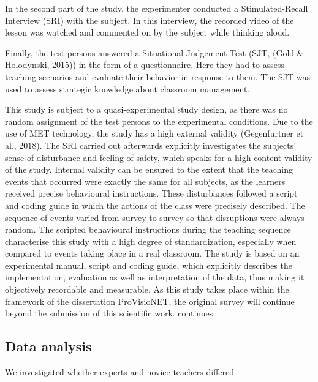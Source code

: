 \documentclass[
  man,floatsintext]{apa6}
\begin{document}
In the second part of the study, the experimenter conducted a Stimulated-Recall Interview (SRI) with the subject. In this interview, the recorded video of the lesson was watched and commented on by the subject while thinking aloud.

Finally, the test persons answered a Situational Judgement Test (SJT, (Gold \& Holodynski, 2015)) in the form of a questionnaire. Here they had to assess teaching scenarios and evaluate their behavior in response to them. The SJT was used to assess strategic knowledge about classroom management.

This study is subject to a quasi-experimental study design, as there was no random assignment of the test persons to the experimental conditions. Due to the use of MET technology, the study has a high external validity (Gegenfurtner et al., 2018). The SRI carried out afterwards explicitly investigates the subjects' sense of disturbance and feeling of safety, which speaks for a high content validity of the study. Internal validity can be ensured to the extent that the teaching events that occurred were exactly the same for all subjects, as the learners received precise behavioural instructions. These disturbances followed a script and coding guide in which the actions of the class were precisely described. The sequence of events varied from survey to survey so that disruptions were always random. The scripted behavioural instructions during the teaching sequence characterise this study with a high degree of standardization, especially when compared to events taking place in a real classroom. The study is based on an experimental manual, script and coding guide, which explicitly describes the implementation, evaluation as well as interpretation of the data, thus making it objectively recordable and measurable. As this study takes place within the framework of the dissertation ProVisioNET, the original survey will continue beyond the submission of this scientific work.
continues.

\hypertarget{data-analysis}{%
\subsection{Data analysis}\label{data-analysis}}

We investigated whether experts and novice teachers differed
\end{document}
